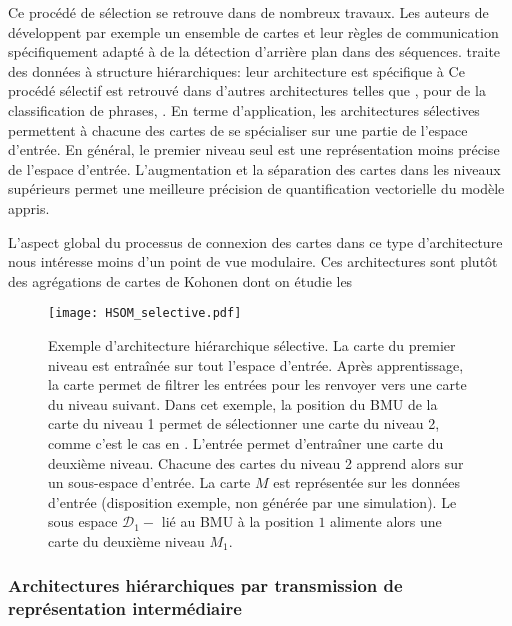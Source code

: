 \documentclass[../main]{subfiles}
\begin{document}
Ce procédé de sélection se retrouve dans de nombreux travaux. 
Les auteurs de \cite{zhao_stacked_2015} développent par exemple un ensemble de cartes et leur règles de communication spécifiquement adapté à de la détection d'arrière plan dans des séquences.
\cite{miikkulainen_script_1992} traite des données à structure hiérarchiques: leur architecture est spécifique à
Ce procédé sélectif est retrouvé dans d'autres architectures telles que \cite{suganthan_pattern_2001}, \cite{miikkulainen_script_1992} pour de la classification de phrases, \cite{dittenbach_growing_2000,ordonez_hierarchical_2010}.
En terme d'application, les architectures sélectives permettent à chacune des cartes de se spécialiser sur une partie de l'espace d'entrée. 
En général, le premier niveau seul est une représentation moins précise de l'espace d'entrée. L'augmentation et la séparation des cartes dans les niveaux supérieurs permet une meilleure précision de quantification vectorielle du modèle appris.


L'aspect global du processus de connexion des cartes dans ce type d'architecture nous intéresse moins d'un point de vue modulaire. Ces architectures sont plutôt des agrégations de cartes de Kohonen dont on étudie les


\begin{figure}
    \texttt{[image: HSOM\_selective.pdf]}
    \caption{Exemple d'architecture hiérarchique sélective. La carte du premier niveau est entraînée sur tout l'espace d'entrée. Après apprentissage, la carte permet de filtrer les entrées pour les renvoyer vers une carte du niveau suivant. Dans cet exemple, la position du BMU de la carte du niveau 1 permet de sélectionner une carte du niveau 2, comme c'est le cas en \cite{barbalho_hierarchical_2001}. 
    L'entrée permet d'entraîner une carte du deuxième niveau. Chacune des cartes du niveau 2 apprend alors sur un sous-espace d'entrée. La carte $M$ est représentée sur les données d'entrée (disposition exemple, non générée par une simulation). Le sous espace $\mathcal{D}_1-$ lié au BMU à la position $1$ alimente alors une carte du deuxième niveau $M_1$.
    \label{fig:hsom_selective}}
\end{figure}


\subsubsection{Architectures hiérarchiques par transmission de représentation intermédiaire}
\end{document}
